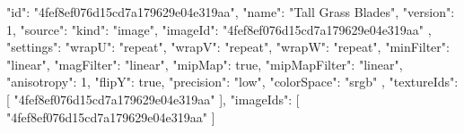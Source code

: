 {
  "id": "4fef8ef076d15cd7a179629e04e319aa",
  "name": "Tall Grass Blades",
  "version": 1,
  "source": {
    "kind": "image",
    "imageId": "4fef8ef076d15cd7a179629e04e319aa"
  },
  "settings": {
    "wrapU": "repeat",
    "wrapV": "repeat",
    "wrapW": "repeat",
    "minFilter": "linear",
    "magFilter": "linear",
    "mipMap": true,
    "mipMapFilter": "linear",
    "anisotropy": 1,
    "flipY": true,
    "precision": "low",
    "colorSpace": "srgb"
  },
  "textureIds": [
    "4fef8ef076d15cd7a179629e04e319aa"
  ],
  "imageIds": [
    "4fef8ef076d15cd7a179629e04e319aa"
  ]
}
